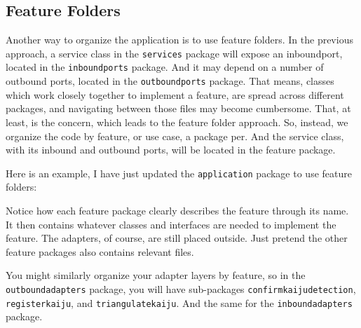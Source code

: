     

\subsection{Feature Folders}

Another way to organize the application is to use feature folders. In the previous approach, a service class in the \texttt{services} package will expose an inboundport, located in the \texttt{inboundports} package. And it may depend on a number of outbound ports, located in the \texttt{outboundports} package. That means, classes which work closely together to implement a feature, are spread across different packages, and navigating between those files may become cumbersome. That, at least, is the concern, which leads to the feature folder approach. So, instead, we organize the code by feature, or use case, a package per. And the service class, with its inbound and outbound ports, will be located in the feature package.

Here is an example, I have just updated the \texttt{application} package to use feature folders:

\begin{figure}[h]
\centering
\begin{minipage}{0.8\textwidth}
\end{minipage}
\end{figure}

Notice how each feature package clearly describes the feature through its name. It then contains whatever classes and interfaces are needed to implement the feature. The adapters, of course, are still placed outside. Just pretend the other feature packages also contains relevant files.

You might similarly organize your adapter layers by feature, so in the \texttt{outboundadapters} package, you will have sub-packages \texttt{confirmkaijudetection}, \texttt{registerkaiju}, and \texttt{triangulatekaiju}. And the same for the \texttt{inboundadapters} package.

